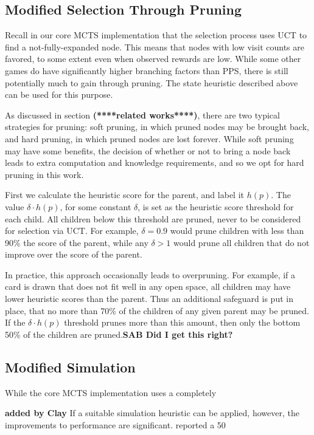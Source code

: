 \documentclass[letterpaper]{article}
\begin{document}
\subsection{Modified Selection Through Pruning}

Recall in our core MCTS implementation that the selection process uses UCT to find a not-fully-expanded node. This means that nodes with low visit counts are favored, to some extent even when observed rewards are low. While some other games do have significantly higher branching factors than PPS, there is still potentially much to gain through pruning. The state heuristic described above can be used for this purpose.

As discussed in section {\bf (****related works****)}, there are two typical strategies for pruning: soft pruning, in which pruned nodes may be brought back, and hard pruning, in which pruned nodes are lost forever. While soft pruning may have some benefits, the decision of whether or not to bring a node back leads to extra computation and knowledge requirements, and so we opt for hard pruning in this work.

First we calculate the heuristic score for the parent, and label it $h(p)$. The value $\delta \cdot h(p)$, for some constant $\delta$, is set as the heuristic score threshold for each child. All children below this threshold are pruned, never to be considered for selection via UCT. For example, $\delta = 0.9$ would prune children with less than 90\% the score of the parent, while any $\delta > 1$ would prune all children that do not improve over the score of the parent.

In practice, this approach occasionally leads to overpruning. For example, if a card is drawn that does not fit well in any open space, all children may have lower heuristic scores than the parent. Thus an additional safeguard is put in place, that no more than 70\% of the children of any given parent may be pruned. If the  $\delta \cdot h(p)$ threshold prunes more than this amount, then only the bottom 50\% of the children are pruned.{\bf SAB Did I get this right?}

\subsection{Modified Simulation}

While the core MCTS implementation uses a completely 

{\bf added by Clay} If a suitable simulation heuristic can be applied, however, the improvements to performance are significant. \cite{schadd2012single} reported a 50%
\end{document}
